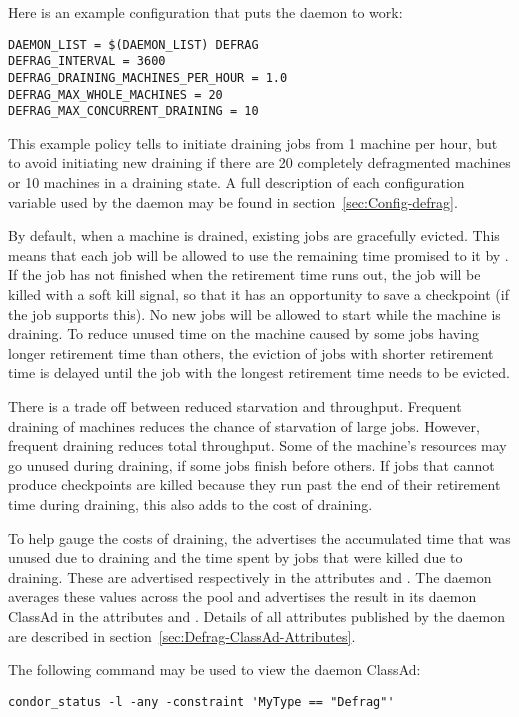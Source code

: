 Here is an example configuration that puts the  daemon to work:

\begin{verbatim}
DAEMON_LIST = $(DAEMON_LIST) DEFRAG
DEFRAG_INTERVAL = 3600
DEFRAG_DRAINING_MACHINES_PER_HOUR = 1.0
DEFRAG_MAX_WHOLE_MACHINES = 20
DEFRAG_MAX_CONCURRENT_DRAINING = 10
\end{verbatim}

This example policy tells  to initiate draining 
jobs from 1 machine per hour,
but to avoid initiating new draining if there are 
20 completely defragmented machines or 10 machines in a draining state.
A full description of each configuration variable
used by the  daemon may be found in 
section~\ref{sec:Config-defrag}.

By default, when a machine is drained, existing jobs are gracefully evicted.
This means that each job will be allowed to use the remaining
time promised to it by .  
If the job has not finished when the retirement time runs out, 
the job will be killed with a soft kill signal, 
so that it has an opportunity to save a checkpoint
(if the job supports this).
No new jobs will be allowed to start while the machine is draining.
To reduce unused time on the
machine caused by some jobs having longer retirement time than others,
the eviction of jobs with shorter retirement time is delayed until the
job with the longest retirement time needs to be evicted.

There is a trade off between reduced starvation and throughput.
Frequent draining of machines reduces the chance of starvation of
large jobs.  However, frequent draining reduces total throughput.
Some of the machine's resources may go unused during draining,
if some jobs finish before others.  
If jobs that cannot produce checkpoints are killed
because they run past the end of their retirement time during draining,
this also adds to the cost of draining.

To help gauge the costs of draining, the  advertises
the accumulated time that was unused due to draining and the time
spent by jobs that were killed due to draining.  
These are advertised
respectively in the attributes  and
.  
The  daemon
averages these values across the pool and advertises the result in its
daemon ClassAd in the attributes  and
.  
Details of all attributes published by
the  daemon are described in
section~\ref{sec:Defrag-ClassAd-Attributes}.

The following command may be used to view the  daemon
ClassAd:

\begin{verbatim}
condor_status -l -any -constraint 'MyType == "Defrag"'
\end{verbatim}

